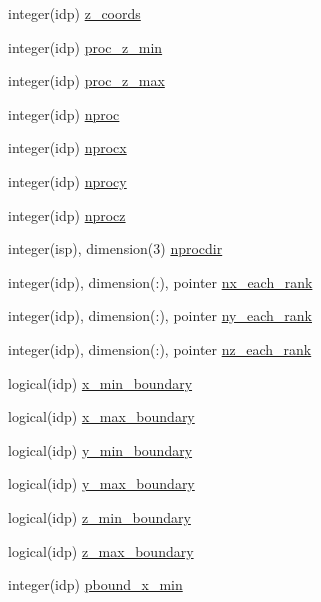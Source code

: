 \begin{DoxyCompactItemize}
integer(idp) \hyperlink{namespaceshared__data_a208c54ff19ecd9211442644004e44a79}{z\+\_\+coords}
\item 
integer(idp) \hyperlink{namespaceshared__data_a06a39cbc901b9e189a9d93eee920aeaa}{proc\+\_\+z\+\_\+min}
\item 
integer(idp) \hyperlink{namespaceshared__data_a8ef64b5a98510b366e28a0f32790c1cc}{proc\+\_\+z\+\_\+max}
\item 
integer(idp) \hyperlink{namespaceshared__data_a17ce7b1395fd76d2bb16c475d56cd08b}{nproc}
\item 
integer(idp) \hyperlink{namespaceshared__data_a83d7bbce1bbb5ff87a019c7ee7fa6f81}{nprocx}
\item 
integer(idp) \hyperlink{namespaceshared__data_a86495fbffc6b53172334c5fe8109fed8}{nprocy}
\item 
integer(idp) \hyperlink{namespaceshared__data_ab80ca6154fd93118dc6455ec5e12de43}{nprocz}
\item 
integer(isp), dimension(3) \hyperlink{namespaceshared__data_a73f0e719e591e27a33b1e75d95ae31cb}{nprocdir}
\item 
integer(idp), dimension(\+:), pointer \hyperlink{namespaceshared__data_a9ea44b080aed4db2eaa320878f266ace}{nx\+\_\+each\+\_\+rank}
\item 
integer(idp), dimension(\+:), pointer \hyperlink{namespaceshared__data_a1307d0cb9f9d652ec67954e53bf04706}{ny\+\_\+each\+\_\+rank}
\item 
integer(idp), dimension(\+:), pointer \hyperlink{namespaceshared__data_a39afe3f315d74dc819777e3345afbdd3}{nz\+\_\+each\+\_\+rank}
\item 
logical(idp) \hyperlink{namespaceshared__data_a1fb2edce254dcc9943d5a9d227ea3c58}{x\+\_\+min\+\_\+boundary}
\item 
logical(idp) \hyperlink{namespaceshared__data_aaa822590de7afd77e48ecc4d9016fe29}{x\+\_\+max\+\_\+boundary}
\item 
logical(idp) \hyperlink{namespaceshared__data_ac54278949a6918cd0e9ed158e4eadb52}{y\+\_\+min\+\_\+boundary}
\item 
logical(idp) \hyperlink{namespaceshared__data_a72d92c74a360b173dd6bc143b5b376b4}{y\+\_\+max\+\_\+boundary}
\item 
logical(idp) \hyperlink{namespaceshared__data_aaa333d54e2048c0199124fa66e0c460e}{z\+\_\+min\+\_\+boundary}
\item 
logical(idp) \hyperlink{namespaceshared__data_ac180e0f2fae72319d7a6be1f1bbf4bb3}{z\+\_\+max\+\_\+boundary}
\item 
integer(idp) \hyperlink{namespaceshared__data_ab9740d57cf165e22f3691c51de24c520}{pbound\+\_\+x\+\_\+min}

\end{DoxyCompactItemize}
